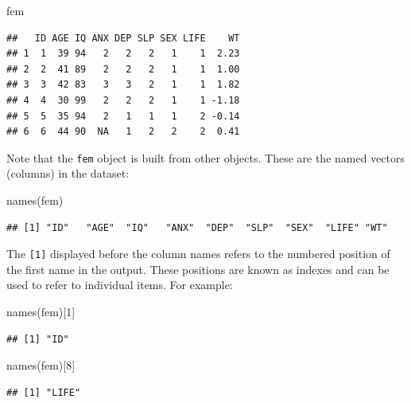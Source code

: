 \documentclass[
  12pt,
]{book}
\newenvironment{Shaded}{\begin{snugshade}}{\end{snugshade}}
\newcommand{\DecValTok}[1]{\textcolor[rgb]{0.00,0.00,0.81}{#1}}
\newcommand{\FunctionTok}[1]{\textcolor[rgb]{0.00,0.00,0.00}{#1}}
\newcommand{\NormalTok}[1]{#1}
\begin{document}
\begin{Shaded}
\begin{Highlighting}[]
\NormalTok{fem}
\end{Highlighting}
\end{Shaded}

\begin{verbatim}
##   ID AGE IQ ANX DEP SLP SEX LIFE    WT
## 1  1  39 94   2   2   2   1    1  2.23
## 2  2  41 89   2   2   2   1    1  1.00
## 3  3  42 83   3   3   2   1    1  1.82
## 4  4  30 99   2   2   2   1    1 -1.18
## 5  5  35 94   2   1   1   1    2 -0.14
## 6  6  44 90  NA   1   2   2    2  0.41
\end{verbatim}

Note that the \texttt{fem} object is built from other objects. These are the named vectors (columns) in the dataset:

\begin{Shaded}
\begin{Highlighting}[]
\FunctionTok{names}\NormalTok{(fem)}
\end{Highlighting}
\end{Shaded}

\begin{verbatim}
## [1] "ID"   "AGE"  "IQ"   "ANX"  "DEP"  "SLP"  "SEX"  "LIFE" "WT"
\end{verbatim}

The \texttt{{[}1{]}} displayed before the column names refers to the numbered position of the first name in the output. These positions are known as indexes and can be used to refer to individual items. For example:

\begin{Shaded}
\begin{Highlighting}[]
\FunctionTok{names}\NormalTok{(fem)[}\DecValTok{1}\NormalTok{]}
\end{Highlighting}
\end{Shaded}

\begin{verbatim}
## [1] "ID"
\end{verbatim}

\begin{Shaded}
\begin{Highlighting}[]
\FunctionTok{names}\NormalTok{(fem)[}\DecValTok{8}\NormalTok{]}
\end{Highlighting}
\end{Shaded}

\begin{verbatim}
## [1] "LIFE"
\end{verbatim}
\end{document}
